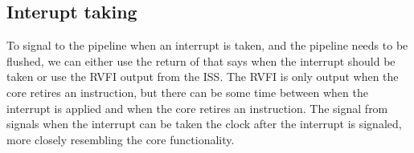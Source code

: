 \subsection{Interupt taking}

To signal to the pipeline when an interrupt is taken, and the pipeline needs to be flushed, we can either use the return of  that says when the interrupt should be taken or use the RVFI output from the ISS. The RVFI is only output when the core retires an instruction, but there can be some time between when the interrupt is applied and when the core retires an instruction. The  signal from  signals when the interrupt can be taken the clock after the interrupt is signaled, more closely resembling the core functionality. 







